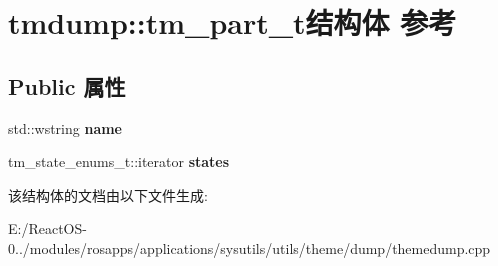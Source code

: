\hypertarget{structtmdump_1_1tm__part__t}{}\section{tmdump\+:\+:tm\+\_\+part\+\_\+t结构体 参考}
\label{structtmdump_1_1tm__part__t}
\subsection*{Public 属性}
\begin{DoxyCompactItemize}
\item 
\mbox{\label{structtmdump_1_1tm__part__t_a40492bc4f2f008d3d7a8ce138c82ef04}} 
std\+::wstring {\bfseries name}
\item 
\mbox{\label{structtmdump_1_1tm__part__t_aa9f6e803b2d38dfb918774946df211ee}} 
tm\+\_\+state\+\_\+enums\+\_\+t\+::iterator {\bfseries states}
\end{DoxyCompactItemize}


该结构体的文档由以下文件生成\+:\begin{DoxyCompactItemize}
\item 
E\+:/\+React\+O\+S-\/0../modules/rosapps/applications/sysutils/utils/theme/dump/themedump.\+cpp\end{DoxyCompactItemize}
